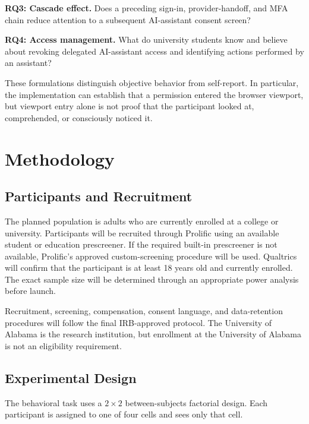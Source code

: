 \documentclass[11pt]{article}
\begin{document}
\textbf{RQ3: Cascade effect.} Does a preceding sign-in, provider-handoff, and
MFA chain reduce attention to a subsequent AI-assistant consent screen?

\textbf{RQ4: Access management.} What do university students know and believe
about revoking delegated AI-assistant access and identifying actions performed
by an assistant?

These formulations distinguish objective behavior from self-report. In
particular, the implementation can establish that a permission entered the
browser viewport, but viewport entry alone is not proof that the participant
looked at, comprehended, or consciously noticed it.

\section{Methodology}

\subsection{Participants and Recruitment}

The planned population is adults who are currently enrolled at a college or
university. Participants will be recruited through Prolific using an available
student or education prescreener. If the required built-in prescreener is not
available, Prolific's approved custom-screening procedure will be used.
Qualtrics will confirm that the participant is at least 18 years old and
currently enrolled. The exact sample size will be determined through an
appropriate power analysis before launch.

Recruitment, screening, compensation, consent language, and data-retention
procedures will follow the final IRB-approved protocol. The University of
Alabama is the research institution, but enrollment at the University of
Alabama is not an eligibility requirement.

\subsection{Experimental Design}

The behavioral task uses a $2 \times 2$ between-subjects factorial design. Each
participant is assigned to one of four cells and sees only that cell.
\end{document}
